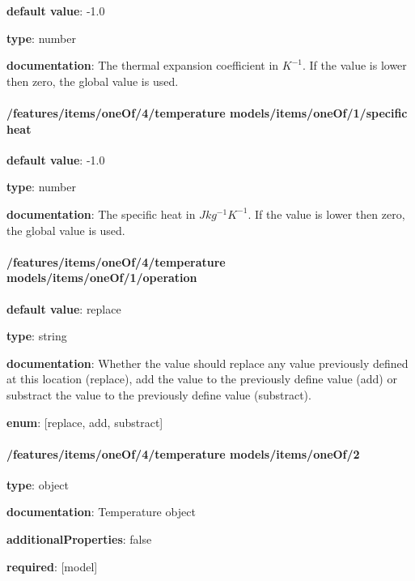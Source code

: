\begin{itemized}
\item {\bf default value}: -1.0
\item {\bf type}: number
\item {\bf documentation}: The thermal expansion coefficient in $K^{-1}$. If the value is lower then zero, the global value is used.
\end{itemized}\paragraph{/features/items/oneOf/4/temperature models/items/oneOf/1/specific heat} \begin{itemized}
\item {\bf default value}: -1.0
\item {\bf type}: number
\item {\bf documentation}: The specific heat in $J kg^{-1} K^{-1}$. If the value is lower then zero, the global value is used.
\end{itemized}\paragraph{/features/items/oneOf/4/temperature models/items/oneOf/1/operation} \begin{itemized}
\item {\bf default value}: replace
\item {\bf type}: string
\item {\bf documentation}: Whether the value should replace any value previously defined at this location (replace), add the value to the previously define value (add) or substract the value to the previously define value (substract).
\item {\bf enum}: [replace, add, substract]\end{itemized}\paragraph{/features/items/oneOf/4/temperature models/items/oneOf/2} \begin{itemized}
\item {\bf type}: object
\item {\bf documentation}: Temperature object
\item {\bf additionalProperties}: false
\item {\bf required}: [model]\end{itemized}
